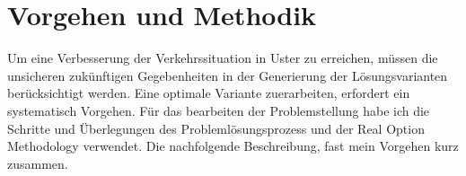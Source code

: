 %
%            
%
%
%

\chapter{Vorgehen und Methodik}
\label{chap:Vorgehen}


Um eine Verbesserung der Verkehrssituation in Uster zu erreichen, müssen die unsicheren zukünftigen Gegebenheiten in der Generierung der Lösungsvarianten berücksichtigt werden. Eine optimale Variante zuerarbeiten, erfordert ein systematisch Vorgehen. 
Für das bearbeiten der Problemstellung habe ich die Schritte und Überlegungen des Problemlösungsprozess und der Real Option Methodology verwendet. Die nachfolgende Beschreibung, fast mein Vorgehen kurz zusammen.

